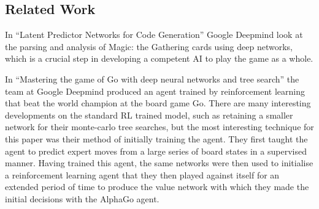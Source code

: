 \subsection{Related Work}
In ``Latent Predictor Networks for Code Generation''\cite{ling2016latent} %
Google Deepmind look at the parsing and analysis of Magic: the Gathering cards using deep networks, which is a crucial step in developing a competent AI to play the game as a whole.

In ``Mastering the game of Go with deep neural networks and tree search''\cite{alphaGo} the team at Google Deepmind produced an agent trained by reinforcement learning that beat the world champion at the board game Go. There are many interesting developments on the standard RL trained model, such as retaining a smaller network for their monte-carlo tree searches, but the most interesting technique for this paper was their method of initially training the agent. They first taught the agent to predict expert moves from a large series of board states in a supervised manner. Having trained this agent, the same networks were then used to initialise a reinforcement learning agent that they then played against itself for an extended period of time to produce the value network with which they made the initial decisions with the AlphaGo agent. 

